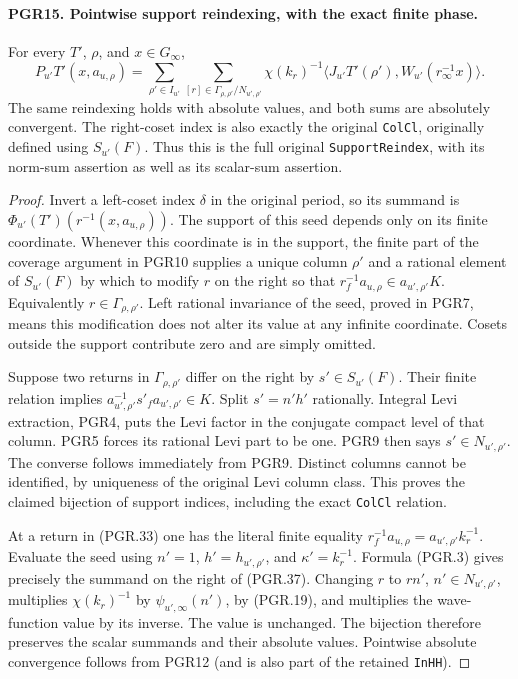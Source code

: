 \paragraph{PGR15. Pointwise support reindexing, with the exact finite phase.}
\label{claim:PGR15}
For every \(T'\), \(\rho\), and \(x\in G_\infty\),
\[
 P_{u'}T'(x,a_{u,\rho})
  =\sum_{\rho'\in I_{u'}}
       \sum_{[r]\in\Gamma_{\rho,\rho'}/N_{u',\rho'}}
         \chi(k_r)^{-1}
           \langle J_{u'}T'(\rho'),W_{u'}(r_\infty^{-1}x)\rangle.
\tag{PGR.37}
\]
The same reindexing holds with absolute values, and both sums are
absolutely convergent.  The right-coset index is also exactly the
original \texttt{ColCl}, originally defined using \(S_{u'}(F)\).
Thus this is the full original \texttt{SupportReindex}, with its
norm-sum assertion as well as its scalar-sum assertion.
\begin{proof}
Invert a left-coset index \(\delta\) in the original period, so
its summand is \(\Phi_{u'}(T')(r^{-1}(x,a_{u,\rho}))\).
The support of this seed depends only on its finite coordinate.
Whenever this coordinate is in the support, the finite part of the
coverage argument in PGR10 supplies a unique column \(\rho'\)
and a rational element of \(S_{u'}(F)\) by which to modify \(r\)
on the right so that
\(r_f^{-1}a_{u,\rho}\in a_{u',\rho'}K\).
Equivalently \(r\in\Gamma_{\rho,\rho'}\).
Left rational invariance of the seed, proved in PGR7, means this
modification does not alter its value at any infinite coordinate.
Cosets outside the support contribute zero and are simply omitted.

Suppose two returns in \(\Gamma_{\rho,\rho'}\) differ on the
right by \(s'\in S_{u'}(F)\).  Their finite relation implies
\(a_{u',\rho'}^{-1}s'_f a_{u',\rho'}\in K\).
Split \(s'=n'h'\) rationally.  Integral Levi extraction, PGR4,
puts the Levi factor in the conjugate compact level of that column.
PGR5 forces its rational Levi part to be one.  PGR9 then says
\(s'\in N_{u',\rho'}\).  The converse follows immediately
from PGR9.  Distinct columns cannot be identified, by uniqueness of
the original Levi column class.  This proves the claimed bijection
of support indices, including the exact \texttt{ColCl} relation.

At a return in (PGR.33) one has the literal finite equality
\(r_f^{-1}a_{u,\rho}=a_{u',\rho'}k_r^{-1}\).
Evaluate the seed using \(n'=1\), \(h'=h_{u',\rho'}\),
and \(\kappa'=k_r^{-1}\).  Formula (PGR.3) gives precisely
the summand on the right of (PGR.37).
Changing \(r\) to \(rn'\), \(n'\in N_{u',\rho'}\),
multiplies \(\chi(k_r)^{-1}\) by
\(\psi_{u',\infty}(n')\), by (PGR.19), and multiplies
the wave-function value by its inverse.  The value is unchanged.
The bijection therefore preserves the scalar summands and their
absolute values.  Pointwise absolute convergence follows from PGR12
(and is also part of the retained \texttt{InHH}).
\end{proof}

